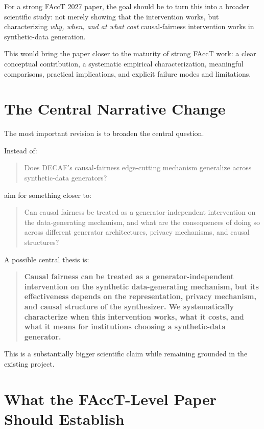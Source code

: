 \documentclass[11pt]{article}
\begin{document}
For a strong FAccT 2027 paper, the goal should be to turn this into a broader scientific study: not merely showing that the intervention works, but characterizing \emph{why, when, and at what cost} causal-fairness intervention works in synthetic-data generation.

This would bring the paper closer to the maturity of strong FAccT work: a clear conceptual contribution, a systematic empirical characterization, meaningful comparisons, practical implications, and explicit failure modes and limitations.

\section*{The Central Narrative Change}

The most important revision is to broaden the central question.

Instead of:

\begin{quote}
Does DECAF's causal-fairness edge-cutting mechanism generalize across synthetic-data generators?
\end{quote}

aim for something closer to:

\begin{quote}
Can causal fairness be treated as a generator-independent intervention on the data-generating mechanism, and what are the consequences of doing so across different generator architectures, privacy mechanisms, and causal structures?
\end{quote}

A possible central thesis is:

\begin{quote}
\textbf{Causal fairness can be treated as a generator-independent intervention on the synthetic data-generating mechanism, but its effectiveness depends on the representation, privacy mechanism, and causal structure of the synthesizer. We systematically characterize when this intervention works, what it costs, and what it means for institutions choosing a synthetic-data generator.}
\end{quote}

This is a substantially bigger scientific claim while remaining grounded in the existing project.

\section*{What the FAccT-Level Paper Should Establish}
\end{document}

